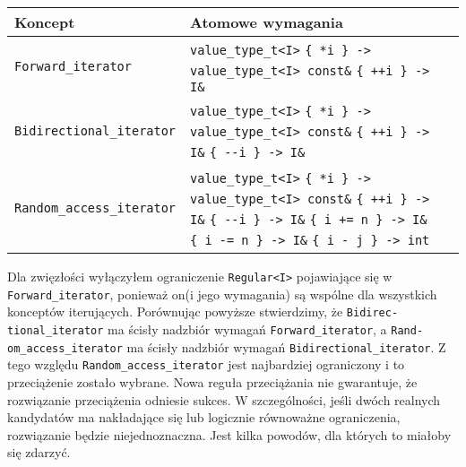 \documentclass[11pt, a4paper]{article}
\begin{document}
\noindent \begin{tabular}{|p{5cm}|p{7cm}|p{1cm}|} \hline
  \hline 
  Koncept & Atomowe wymagania \\
  \hline 
  \verb#Forward_iterator# & \verb#value_type_t<I># \verb#{ *i } -> value_type_t<I> const&# \verb#{ ++i } -> I&# \\
  \hline
  \verb#Bidirectional_iterator# & \verb#value_type_t<I># \verb#{ *i } -> value_type_t<I> const&# \verb#{ ++i } -> I&# \newline \verb#{ --i } -> I&# \\
  \hline
  \verb#Random_access_iterator# & \verb#value_type_t<I># \verb#{ *i } -> value_type_t<I> const&# \verb#{ ++i } -> I&# \newline \verb#{ --i } -> I&# \newline \verb#{ i += n } -> I&# \newline \verb#{ i -= n } -> I&# \newline \verb#{ i - j } -> int# \\
  \hline
  
\end{tabular} \newline

Dla zwięzłości wyłączyłem ograniczenie \verb#Regular<I># pojawiające się w \verb#Forward_iterator#, ponieważ on(i jego wymagania) są wspólne dla wszystkich konceptów iterujących. Porównując powyższe stwierdzimy, że \verb#Bidirec-# \newline \verb#tional_iterator# ma ścisły nadzbiór wymagań \verb#Forward_iterator#, a \verb#Rand-# \newline \verb#om_access_iterator# ma ścisły nadzbiór wymagań \verb#Bidirectional_iterator#. Z tego względu \verb#Random_access_iterator# jest najbardziej ograniczony i to przeciążenie zostało wybrane. Nowa reguła przeciążania nie gwarantuje, że rozwiązanie przeciążenia odniesie sukces. W szczególności, jeśli dwóch realnych kandydatów ma nakładające się lub logicznie równoważne ograniczenia, rozwiązanie będzie niejednoznaczna. Jest kilka powodów, dla których to miałoby się zdarzyć.
\end{document}
